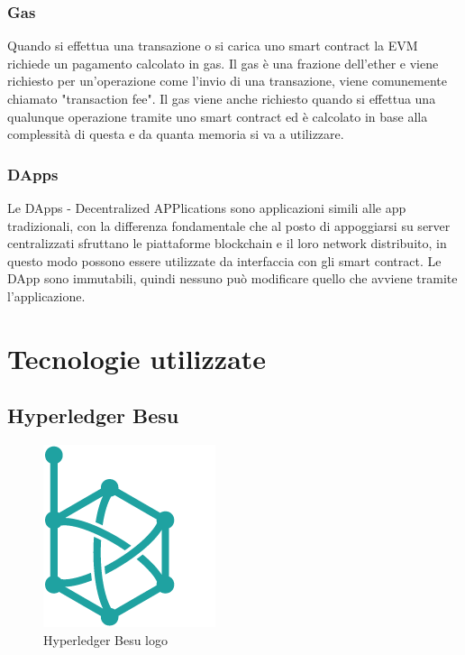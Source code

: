 \documentclass[11pt,a4paper,titlepage,twoside,openright]{report}
\begin{document}
\subsection{Gas}
Quando si effettua una transazione o si carica uno smart contract la EVM richiede un pagamento calcolato in gas. Il gas è una frazione dell'ether e viene richiesto per un'operazione come l'invio di una transazione, viene comunemente chiamato "transaction fee". Il gas viene anche richiesto quando si effettua una qualunque operazione tramite uno smart contract ed è calcolato in base alla complessità di questa e da quanta memoria si va a utilizzare. 

\subsection{DApps}

Le DApps - Decentralized APPlications sono applicazioni simili alle app tradizionali, con la differenza fondamentale che al posto di appoggiarsi su server centralizzati sfruttano le piattaforme blockchain e il loro network distribuito, in questo modo possono essere utilizzate da interfaccia con gli smart contract. Le DApp sono immutabili, quindi nessuno può modificare quello che avviene tramite l’applicazione.

\chapter{Tecnologie utilizzate}

\section{Hyperledger Besu}
\begin{figure}
	\includegraphics[height=0.2\textheight]{Hyperledger_Besu}
	\centering
	\caption{Hyperledger Besu logo}
	\label{fig:Hyperledger_Besu_logo}
\end{figure}
\end{document}
